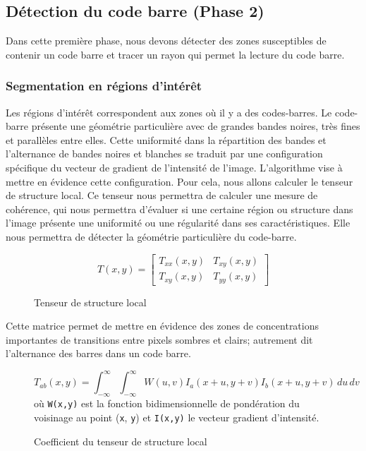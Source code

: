 \documentclass{rapport}
\begin{document}
\subsection{Détection du code barre (Phase 2)}
Dans cette première phase, nous devons détecter des zones susceptibles de contenir un code barre et tracer un rayon qui permet la lecture du code barre.

\subsubsection*{Segmentation en régions d’intérêt}
Les régions d’intérêt correspondent aux zones où il y a des codes-barres. Le code-barre présente une géométrie particulière avec de grandes bandes noires, très fines et parallèles entre elles. Cette uniformité dans la répartition des bandes et l'alternance de bandes noires et blanches se traduit par une configuration spécifique du vecteur de gradient de l’intensité de l'image.
\newline \newline L’algorithme vise à mettre en évidence cette configuration. Pour cela, nous allons calculer le tenseur de structure local. Ce tenseur nous permettra de calculer une mesure de cohérence, qui nous permettra d'évaluer si une certaine région ou structure dans l'image présente une uniformité ou une régularité dans ses caractéristiques. Elle nous permettra de détecter la géométrie particulière du code-barre.

\begin{figure}[h!]
\centering
\[
T(x, y) =
\begin{bmatrix}
T_{xx}(x, y) & T_{xy}(x, y) \\
T_{xy}(x, y) & T_{yy}(x, y)
\end{bmatrix}
\]
\caption{Tenseur de structure local}
\end{figure}
Cette matrice permet de mettre en évidence des zones de concentrations importantes de transitions entre pixels sombres et clairs; autrement dit l'alternance des barres dans un code barre.
\begin{figure}[h!]
\[
T_{ab}(x, y) = \int_{-\infty}^{\infty} \int_{-\infty}^{\infty} W(u, v) I_a(x + u, y + v) I_b(x + u, y + v) \, du \, dv
\]
où \texttt{W(x,y)} est la fonction bidimensionnelle de pondération du voisinage au point (\texttt{x}, \texttt{y}) et \texttt{I(x,y)} le vecteur gradient d'intensité.
\caption{Coefficient du tenseur de structure local}
\end{figure}
\end{document}
